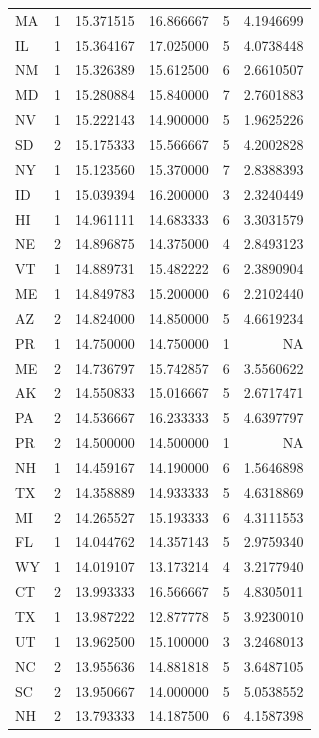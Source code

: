 \documentclass[
  letterpaper,
  DIV=11,
  numbers=noendperiod]{scrartcl}
\begin{document}
\begin{longtable}[t]{lrrrrr}
MA & 1 & 15.371515 & 16.866667 & 5 & 4.1946699\\
\addlinespace
IL & 1 & 15.364167 & 17.025000 & 5 & 4.0738448\\
NM & 1 & 15.326389 & 15.612500 & 6 & 2.6610507\\
MD & 1 & 15.280884 & 15.840000 & 7 & 2.7601883\\
NV & 1 & 15.222143 & 14.900000 & 5 & 1.9625226\\
SD & 2 & 15.175333 & 15.566667 & 5 & 4.2002828\\
\addlinespace
NY & 1 & 15.123560 & 15.370000 & 7 & 2.8388393\\
ID & 1 & 15.039394 & 16.200000 & 3 & 2.3240449\\
HI & 1 & 14.961111 & 14.683333 & 6 & 3.3031579\\
NE & 2 & 14.896875 & 14.375000 & 4 & 2.8493123\\
VT & 1 & 14.889731 & 15.482222 & 6 & 2.3890904\\
\addlinespace
ME & 1 & 14.849783 & 15.200000 & 6 & 2.2102440\\
AZ & 2 & 14.824000 & 14.850000 & 5 & 4.6619234\\
PR & 1 & 14.750000 & 14.750000 & 1 & NA\\
ME & 2 & 14.736797 & 15.742857 & 6 & 3.5560622\\
AK & 2 & 14.550833 & 15.016667 & 5 & 2.6717471\\
\addlinespace
PA & 2 & 14.536667 & 16.233333 & 5 & 4.6397797\\
PR & 2 & 14.500000 & 14.500000 & 1 & NA\\
NH & 1 & 14.459167 & 14.190000 & 6 & 1.5646898\\
TX & 2 & 14.358889 & 14.933333 & 5 & 4.6318869\\
MI & 2 & 14.265527 & 15.193333 & 6 & 4.3111553\\
\addlinespace
FL & 1 & 14.044762 & 14.357143 & 5 & 2.9759340\\
WY & 1 & 14.019107 & 13.173214 & 4 & 3.2177940\\
CT & 2 & 13.993333 & 16.566667 & 5 & 4.8305011\\
TX & 1 & 13.987222 & 12.877778 & 5 & 3.9230010\\
UT & 1 & 13.962500 & 15.100000 & 3 & 3.2468013\\
\addlinespace
NC & 2 & 13.955636 & 14.881818 & 5 & 3.6487105\\
SC & 2 & 13.950667 & 14.000000 & 5 & 5.0538552\\
NH & 2 & 13.793333 & 14.187500 & 6 & 4.1587398\\

\end{longtable}
\end{document}
